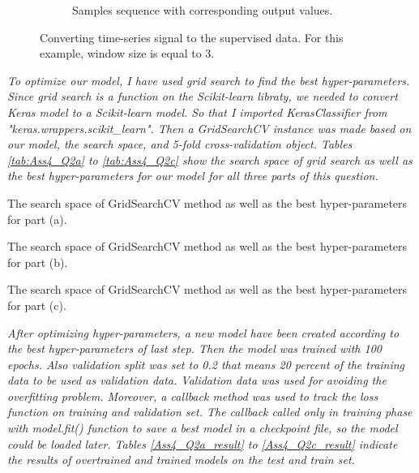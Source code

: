 \begin{figure}[H]
\begin{subfigure}[b]{.25\textwidth}
         \caption{Samples sequence with corresponding output values.}
         \label{fig:ROC_fcn}
     \end{subfigure} 
        \caption{Converting time-series signal to the supervised data. For this example, window size is equal to 3. }
        \label{fig:ROC}
\end{figure}

\textit{To optimize our model, I have used grid search to find the best hyper-parameters. Since grid search is a function on the Scikit-learn libraty, we needed to convert Keras model to a Scikit-learn model. So that I imported KerasClassifier from "keras.wrappers.scikit\_learn". Then a GridSearchCV instance was made based on our model, the search space, and 5-fold cross-validation object. Tables \ref{tab:Ass4_Q2a} to \ref{tab:Ass4_Q2c} show the search space of grid search as well as the best hyper-parameters for our model for all three parts of this question. }


\begin{table}[H]
\centering
\caption{The search space of GridSearchCV method as well as the best hyper-parameters for part (a).}
\label{tab:Ass4_Q2a}

\end{table}

\begin{table}[H]
\centering
\caption{The search space of GridSearchCV method as well as the best hyper-parameters for part (b).}
\label{tab:Ass4_Q2b}

\end{table}


\begin{table}[H]
\centering
\caption{The search space of GridSearchCV method as well as the best hyper-parameters for part (c).}
\label{tab:Ass4_Q2c}

\end{table}

 

\textit{After optimizing hyper-parameters, a new model have been created according to the best hyper-parameters of last step. Then the model was trained with 100 epochs. Also validation split was set to 0.2 that means 20 percent of the training data to be used as validation data. Validation data was used for avoiding the overfitting problem. Moreover, a callback method was used to track the loss function on training and validation set. The callback called only in training phase with model.fit() function to save a best model in a checkpoint file, so the model could be loaded later. Tables \ref{Ass4_Q2a_result} to  \ref{Ass4_Q2c_result} indicate the results of overtrained and trained models on the test and train set. }

